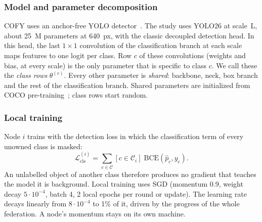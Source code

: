 \documentclass[pdflatex,sn-mathphys-num]{sn-jnl}
\newcommand{\sys}{COFY}
\begin{document}
\subsubsection{Model and parameter decomposition}
\sys{} uses an anchor-free YOLO detector~\cite{redmon2016yolo,ultralytics}. The study uses YOLO26 at scale~L, about 25~M parameters at 640~px, with the classic decoupled detection head. In this head, the last $1\times1$ convolution of the classification branch at each scale maps features to one logit per class. Row $c$ of these convolutions (weights and bias, at every scale) is the only parameter that is specific to class $c$. We call these the \emph{class rows} $\theta^{(c)}$. Every other parameter is \emph{shared}: backbone, neck, box branch and the rest of the classification branch. Shared parameters are initialized from COCO pre-training~\cite{lin2014coco}; class rows start random.

\subsubsection{Local training}
Node $i$ trains with the detection loss in which the classification term of every unowned class is masked:
\begin{equation}
\mathcal{L}^{(i)}_{\text{cls}}=\sum_{c\in\mathcal{C}}[c\in\mathcal{C}_i]\;\mathrm{BCE}(\hat p_c,y_c).
\end{equation}
An unlabelled object of another class therefore produces no gradient that teaches the model it is background. Local training uses SGD (momentum 0.9, weight decay $5\cdot10^{-4}$, batch 4, 2 local epochs per round or update). The learning rate decays linearly from $8\cdot10^{-4}$ to 1\% of it, driven by the progress of the whole federation. A node's momentum stays on its own machine.
\end{document}
